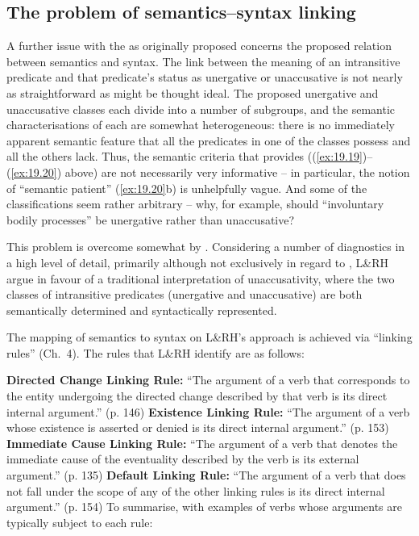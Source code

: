 \documentclass[output=paper]{langsci/langscibook}
\begin{document}
\subsection{The problem of semantics--syntax linking}

A further issue with the  as originally proposed
concerns the proposed relation between semantics and syntax. The link between
the meaning of an intransitive predicate and that predicate’s status as
unergative or unaccusative is not nearly as straightforward as might be thought
ideal. The proposed unergative and unaccusative classes each divide into a
number of subgroups, and the semantic characterisations of each are somewhat
heterogeneous: there is no immediately apparent semantic feature that all the
predicates in one of the classes possess and all the others lack. Thus, the
semantic criteria that \citet{Perlmutter1978} provides
((\ref{ex:19.19})--(\ref{ex:19.20}) above) are not necessarily very informative
– in particular, the notion of \enquote{semantic patient} (\ref{ex:19.20}b) is
unhelpfully vague. And some of the classifications seem rather arbitrary – why,
for example, should \enquote{involuntary bodily processes} be
unergative rather than unaccusative?

This problem is overcome somewhat by \citet{LevinRappaportHovav1995}.
Considering a number of diagnostics in a high level of detail, primarily
although not exclusively in regard to , L\&RH argue in favour of a
traditional interpretation of unaccusativity, where the two classes of
intransitive predicates (unergative and unaccusative) are both semantically
determined and syntactically represented.

The mapping of semantics to syntax on L\&RH’s approach is achieved via
\enquote{linking rules} (Ch.\ 4). The rules that L\&RH identify are as follows:

\ea
    \ea \textbf{Directed Change Linking Rule:} \enquote{The argument of a verb that corresponds to the entity undergoing the directed change described by that verb is its direct internal argument.} (p. 146)
    \ex \textbf{Existence Linking Rule:} \enquote{The argument of a verb whose existence is asserted or denied is its direct internal argument.} (p. 153)
    \ex \textbf{Immediate Cause Linking Rule:} \enquote{The argument of a verb that denotes the immediate cause of the eventuality described by the verb is its external argument.} (p. 135)
    \ex \textbf{Default Linking Rule:} \enquote{The argument of a verb that does not fall under the scope of any of the other linking rules is its direct internal argument.} (p. 154)
    \z
\z
To summarise, with examples of verbs whose arguments are typically subject to
each rule:
\end{document}
